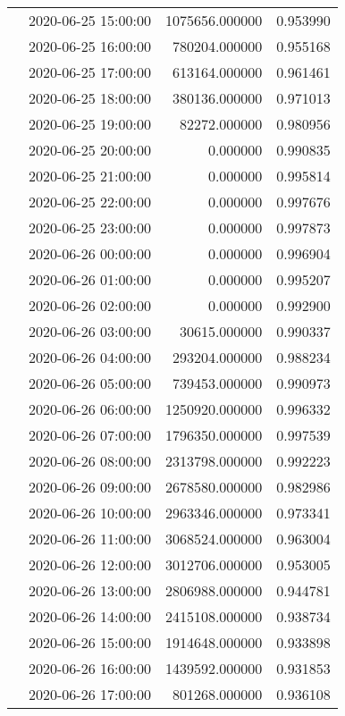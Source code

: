 \begin{tabular}{llrr}
 & 2020-06-25 15:00:00 & 1075656.000000 & 0.953990 \\
 & 2020-06-25 16:00:00 & 780204.000000 & 0.955168 \\
 & 2020-06-25 17:00:00 & 613164.000000 & 0.961461 \\
 & 2020-06-25 18:00:00 & 380136.000000 & 0.971013 \\
 & 2020-06-25 19:00:00 & 82272.000000 & 0.980956 \\
 & 2020-06-25 20:00:00 & 0.000000 & 0.990835 \\
 & 2020-06-25 21:00:00 & 0.000000 & 0.995814 \\
 & 2020-06-25 22:00:00 & 0.000000 & 0.997676 \\
 & 2020-06-25 23:00:00 & 0.000000 & 0.997873 \\
 & 2020-06-26 00:00:00 & 0.000000 & 0.996904 \\
 & 2020-06-26 01:00:00 & 0.000000 & 0.995207 \\
 & 2020-06-26 02:00:00 & 0.000000 & 0.992900 \\
 & 2020-06-26 03:00:00 & 30615.000000 & 0.990337 \\
 & 2020-06-26 04:00:00 & 293204.000000 & 0.988234 \\
 & 2020-06-26 05:00:00 & 739453.000000 & 0.990973 \\
 & 2020-06-26 06:00:00 & 1250920.000000 & 0.996332 \\
 & 2020-06-26 07:00:00 & 1796350.000000 & 0.997539 \\
 & 2020-06-26 08:00:00 & 2313798.000000 & 0.992223 \\
 & 2020-06-26 09:00:00 & 2678580.000000 & 0.982986 \\
 & 2020-06-26 10:00:00 & 2963346.000000 & 0.973341 \\
 & 2020-06-26 11:00:00 & 3068524.000000 & 0.963004 \\
 & 2020-06-26 12:00:00 & 3012706.000000 & 0.953005 \\
 & 2020-06-26 13:00:00 & 2806988.000000 & 0.944781 \\
 & 2020-06-26 14:00:00 & 2415108.000000 & 0.938734 \\
 & 2020-06-26 15:00:00 & 1914648.000000 & 0.933898 \\
 & 2020-06-26 16:00:00 & 1439592.000000 & 0.931853 \\
 & 2020-06-26 17:00:00 & 801268.000000 & 0.936108 \\
\end{tabular}

